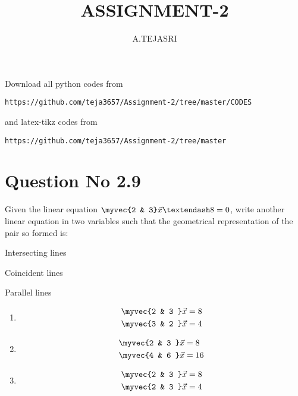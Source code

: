 \documentclass[journal,12pt,twocolumn]{IEEEtran}
\begin{document}
     \def\rightbox#1{\makebox[0in][r]{#1}}
     \def\centbox#1{\makebox[0in]{#1}}
     \def\topbox#1{\raisebox{-\baselineskip}[0in][0in]{#1}}
     \def\midbox#1{\raisebox{-0.5\baselineskip}[0in][0in]{#1}}
\vspace{3cm}
\title{ASSIGNMENT-2}
\author{A.TEJASRI}
\maketitle
\newpage
\bigskip
\renewcommand{\thefigure}{\theenumi}
\renewcommand{\thetable}{\theenumi}
Download all python codes from 
\begin{lstlisting}
https://github.com/teja3657/Assignment-2/tree/master/CODES
\end{lstlisting}
%
and latex-tikz codes from 
%
\begin{lstlisting}
https://github.com/teja3657/Assignment-2/tree/master
\end{lstlisting}
%
\section{Question No 2.9}
Given the linear equation $\myvec{2 & 3}\vec{x} – 8 = 0$, write another linear equation in two variables such that the geometrical representation of the pair so formed is: 
\begin{enumerate}[itemsep=2pt]
\begin{multicols}{2}
\item Intersecting lines
\item Coincident lines 
\item Parallel lines
\end{multicols}
\end{enumerate}
%
\begin{enumerate}
\item
\begin{align}
\begin{split}
\myvec{2 & 3 }\vec{x}&=8
\\
\myvec{3 & 2 }\vec{x}&=4 \label{1.0.1} 
\end{split}
\end{align}
\item
\begin{align}
\begin{split}
\myvec{2 & 3 }\vec{x}&=8
\\
\myvec{4 & 6 }\vec{x}&=16 \label{1.0.2}
\end{split}
\end{align}
\item
\begin{align}
\begin{split}
\myvec{2 & 3 }\vec{x}&=8
\\
\myvec{2 & 3 }\vec{x}&=4 \label{1.0.3}
\end{split}
\end{align}
\end{enumerate}
%
\end{document}
